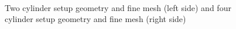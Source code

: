 \begin{figure}[h]
\begin{subfigure}{0.24\textwidth}
        \end{subfigure}
        \\
        
        \caption[Two cylinder and four cylinder setup]{Two cylinder setup geometry and fine mesh (left side) and four cylinder setup geometry and fine mesh (right side)}
        \label{fig:Two_Four_Wires}
  \end{figure}
  
